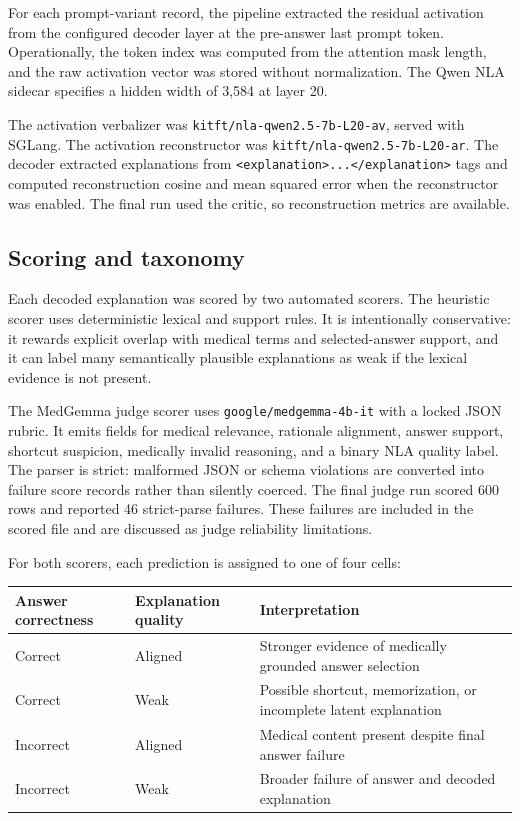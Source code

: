 \documentclass{article}
\begin{document}
For each prompt-variant record, the pipeline extracted the residual activation from the configured decoder layer at the pre-answer last prompt token. Operationally, the token index was computed from the attention mask length, and the raw activation vector was stored without normalization. The Qwen NLA sidecar specifies a hidden width of 3,584 at layer 20.

The activation verbalizer was \texttt{kitft/nla-qwen2.5-7b-L20-av}, served with SGLang. The activation reconstructor was \texttt{kitft/nla-qwen2.5-7b-L20-ar}. The decoder extracted explanations from \texttt{<explanation>...</explanation>} tags and computed reconstruction cosine and mean squared error when the reconstructor was enabled. The final run used the critic, so reconstruction metrics are available.

\subsection{Scoring and taxonomy}

Each decoded explanation was scored by two automated scorers. The heuristic scorer uses deterministic lexical and support rules. It is intentionally conservative: it rewards explicit overlap with medical terms and selected-answer support, and it can label many semantically plausible explanations as weak if the lexical evidence is not present.

The MedGemma judge scorer uses \texttt{google/medgemma-4b-it} with a locked JSON rubric. It emits fields for medical relevance, rationale alignment, answer support, shortcut suspicion, medically invalid reasoning, and a binary NLA quality label. The parser is strict: malformed JSON or schema violations are converted into failure score records rather than silently coerced. The final judge run scored 600 rows and reported 46 strict-parse failures. These failures are included in the scored file and are discussed as judge reliability limitations.

For both scorers, each prediction is assigned to one of four cells:

\begin{center}
\begin{tabular}{lll}
\toprule
Answer correctness & Explanation quality & Interpretation \\
\midrule
Correct & Aligned & Stronger evidence of medically grounded answer selection \\
Correct & Weak & Possible shortcut, memorization, or incomplete latent explanation \\
Incorrect & Aligned & Medical content present despite final answer failure \\
Incorrect & Weak & Broader failure of answer and decoded explanation \\
\bottomrule
\end{tabular}
\end{center}
\end{document}
